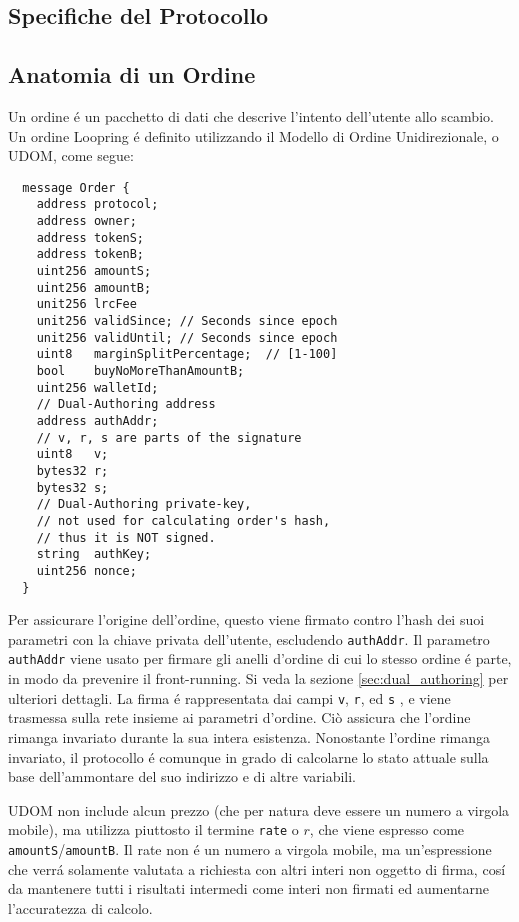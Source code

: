 \documentclass[UTF8,nofonts]{article}
\begin{document}
\begin{multicols}{2}
\section{Specifiche del Protocollo\label{sec:protocol}}

\subsection{Anatomia di un Ordine\label{anatomy}}
Un ordine \'e un pacchetto di dati che descrive l'intento dell'utente allo scambio. Un ordine Loopring  \'e definito utilizzando il Modello di Ordine Unidirezionale, o UDOM, come segue:

\begin{verbatim}
  message Order {
    address protocol;
    address owner;
    address tokenS;
    address tokenB;
    uint256 amountS;
    uint256 amountB;
    unit256 lrcFee
    unit256 validSince; // Seconds since epoch
    unit256 validUntil; // Seconds since epoch
    uint8   marginSplitPercentage;  // [1-100]
    bool    buyNoMoreThanAmountB;
    uint256 walletId;
    // Dual-Authoring address
    address authAddr;
   	// v, r, s are parts of the signature
    uint8   v;
    bytes32 r;
    bytes32 s;
    // Dual-Authoring private-key,
    // not used for calculating order's hash,
    // thus it is NOT signed.
    string  authKey;
    uint256 nonce;
  }
\end{verbatim}


Per assicurare l'origine dell'ordine, questo viene firmato contro l'hash dei suoi parametri con la chiave privata dell'utente, escludendo \verb|authAddr|. Il parametro \verb|authAddr| viene usato per firmare gli anelli d'ordine di cui lo stesso ordine \'e parte, in modo da prevenire il front-running. Si veda la sezione \ref{sec:dual_authoring} per ulteriori dettagli. La firma \'e rappresentata dai campi \verb|v|, \verb|r|, ed \verb|s| , e viene trasmessa sulla rete insieme ai parametri d'ordine. Ciò assicura che l'ordine rimanga invariato durante la sua intera esistenza. Nonostante l'ordine rimanga invariato, il protocollo \'e comunque in grado di calcolarne lo stato attuale sulla base dell'ammontare del suo indirizzo e di altre variabili.


UDOM non include alcun prezzo (che per natura deve essere un numero a virgola mobile), ma utilizza piuttosto il termine \verb|rate| o $r$, che viene espresso come \verb|amountS|/\verb|amountB|. Il rate non \'e un numero a virgola mobile, ma un'espressione che verr\'a solamente valutata a richiesta con altri interi non oggetto di firma, cos\'i da mantenere tutti i risultati intermedi come interi non firmati ed aumentarne l'accuratezza di calcolo.


\end{multicols}
\end{document}
